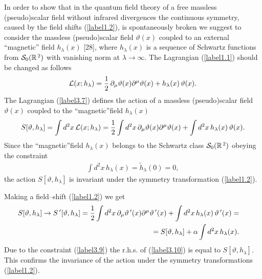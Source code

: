 \documentclass[a4paper,12pt] {article}
\begin{document}
In order to show that in the quantum field theory of a free massless
(pseudo)scalar field without infrared divergences the continuous
symmetry, caused by the field shifts (\ref{label1.2}), is
spontaneously broken we suggest to consider the massless
(pseudo)scalar field $\vartheta(x)$ coupled to an external
``magnetic'' field $h_{\lambda}(x)$ [28], where $h_{\lambda}(x)$ is a
sequence of Schwartz functions from ${\cal S}_0(\mathbb{R}^{\,2})$
with vanishing norm at $\lambda \to \infty$. The Lagrangian
(\ref{label1.1}) should be changed as follows
%
\begin{eqnarray}\label{label3.7}
{\cal L}(x; h_{\lambda}) =
\frac{1}{2}\,\partial_{\mu}\vartheta(x)\partial^{\mu}\vartheta(x) +
h_{\lambda}(x)\,\vartheta(x).
\end{eqnarray}
%
The Lagrangian (\ref{label3.7}) defines the action of a massless
(pseudo)scalar field $\vartheta(x)$ coupled to the ``magnetic''field
$h_{\lambda}(x)$
%
\begin{eqnarray}\label{label3.8}
S[\vartheta, h_{\lambda}] = \int d^2x\,{\cal L}(x; h_{\lambda}) =
\frac{1}{2}\int
d^2x\,\partial_{\mu}\vartheta(x)\partial^{\mu}\vartheta(x) +\int d^2x\,
h_{\lambda}(x)\,\vartheta(x).
\end{eqnarray}
%
Since the ``magnetic''field $h_{\lambda}(x)$ belongs to the Schwartz 
class ${\cal S}_0(\mathbb{R}^{\,2})$ obeying the constraint
%
\begin{eqnarray}\label{label3.9}
\int d^2x\,h_{\lambda}(x) = \tilde{h}_{\lambda}(0) = 0,
\end{eqnarray}
%
the action $S[\vartheta, h_{\lambda}]$ is invariant under the symmetry
transformation (\ref{label1.2}).

Making a field--shift (\ref{label1.2}) we get
%
\begin{eqnarray}\label{label3.10}
\hspace{-0.3in}&&S[\vartheta, h_{\lambda}] \to S\,'[\vartheta,
h_{\lambda}] = \frac{1}{2}\int
d^2x\,\partial_{\mu}\vartheta\,'(x)\partial^{\mu}\vartheta\,'(x) +\int
d^2x\, h_{\lambda}(x)\,\vartheta\,'(x) =\nonumber\\ \hspace{-0.3in}&&=
S[\vartheta, h_{\lambda}] + \alpha\int d^2x\,h_{\lambda}(x).
\end{eqnarray}
%
Due to the constraint (\ref{label3.9}) the r.h.s. of (\ref{label3.10})
is equal to $S[\vartheta, h_{\lambda}]$. This confirms the invariance
of the action under the symmetry transformations (\ref{label1.2}).
\end{document}
